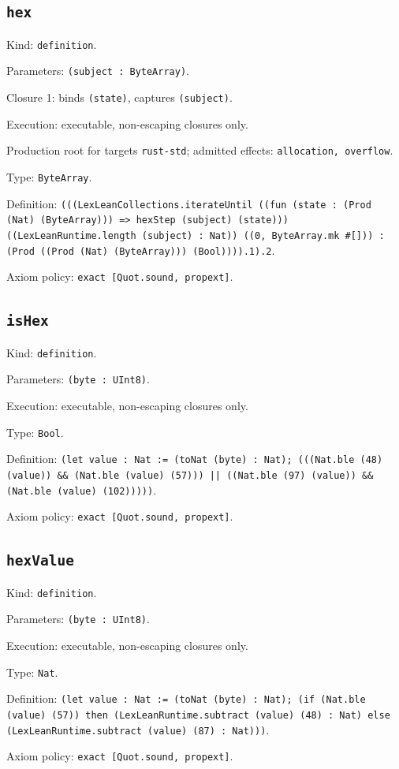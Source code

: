 \documentclass[11pt]{article}
\begin{document}
\subsection*{\texttt{hex}}
\noindent Kind: \texttt{definition}.\par
\noindent Parameters: \texttt{(subject : ByteArray)}.\par
\noindent Closure 1: binds \texttt{(state)}, captures \texttt{(subject)}.\par
\noindent Execution: executable, non-escaping closures only.\par
\noindent Production root for targets \texttt{rust-std}; admitted effects: \texttt{allocation, overflow}.\par
\noindent Type: \texttt{ByteArray}.\par
\noindent Definition: \texttt{(((LexLeanCollections.iterateUntil ((fun (state : (Prod (Nat) (ByteArray))) => hexStep (subject) (state))) ((LexLeanRuntime.length (subject) : Nat)) ((0, ByteArray.mk \#[])) : (Prod ((Prod (Nat) (ByteArray))) (Bool)))).1).2}.\par
\noindent Axiom policy: \texttt{exact [Quot.sound, propext]}.\par
\subsection*{\texttt{isHex}}
\noindent Kind: \texttt{definition}.\par
\noindent Parameters: \texttt{(byte : UInt8)}.\par
\noindent Execution: executable, non-escaping closures only.\par
\noindent Type: \texttt{Bool}.\par
\noindent Definition: \texttt{(let value : Nat := (toNat (byte) : Nat); (((Nat.ble (48) (value)) \&\& (Nat.ble (value) (57))) || ((Nat.ble (97) (value)) \&\& (Nat.ble (value) (102)))))}.\par
\noindent Axiom policy: \texttt{exact [Quot.sound, propext]}.\par
\subsection*{\texttt{hexValue}}
\noindent Kind: \texttt{definition}.\par
\noindent Parameters: \texttt{(byte : UInt8)}.\par
\noindent Execution: executable, non-escaping closures only.\par
\noindent Type: \texttt{Nat}.\par
\noindent Definition: \texttt{(let value : Nat := (toNat (byte) : Nat); (if (Nat.ble (value) (57)) then (LexLeanRuntime.subtract (value) (48) : Nat) else (LexLeanRuntime.subtract (value) (87) : Nat)))}.\par
\noindent Axiom policy: \texttt{exact [Quot.sound, propext]}.\par
\end{document}
